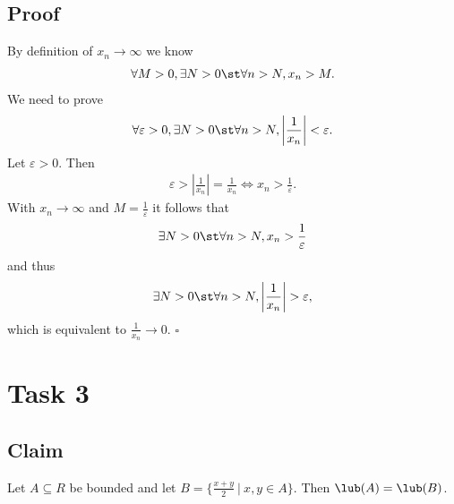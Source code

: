 \documentclass{article}
\begin{document}
\subsection*{Proof}
By definition of $x_n\to\infty$ we know
\begin{align*}
  \forall M > 0, \exists N> 0 \st \forall n > N, x_n > M.
\end{align*}
We need to prove
\begin{align*}
  \forall \varepsilon > 0, \exists N > 0\st \forall n > N, \left|\frac{1}{x_n}\right|<\varepsilon.
\end{align*}
Let $\varepsilon > 0$. Then
\begin{align*}
  \varepsilon > \left|\frac{1}{x_n}\right| = \frac{1}{x_n} \Leftrightarrow x_n > \frac{1}{\varepsilon}.
\end{align*}
With $x_n\to \infty$ and $M=\frac{1}{\varepsilon}$ it follows that
\begin{align*}
  \exists N > 0 \st \forall n > N, x_n > \frac{1}{\varepsilon}
\end{align*}
and thus
\begin{align*}
  \exists N > 0 \st \forall n > N, \left|\frac{1}{x_n}\right|>\varepsilon,
\end{align*}
which is equivalent to $\frac{1}{x_n}\to 0$. $\square$
\section*{Task 3}
\subsection*{Claim}
Let $A\subseteq R$ be bounded and let $B=\{\frac{x+y}{2}\:|\:x,y\in A\}$. Then $\lub(A)=\lub(B)$.
\end{document}
